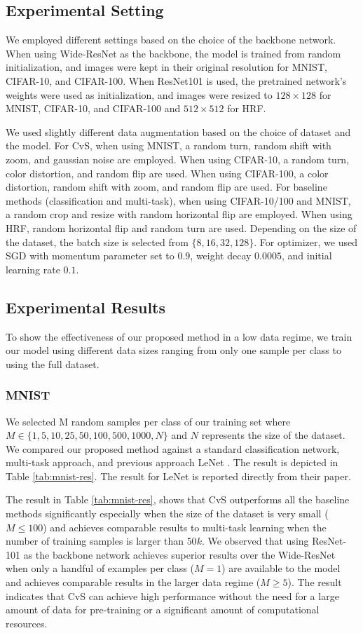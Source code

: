 \documentclass[conference]{IEEEtran}
\begin{document}
\subsection{Experimental Setting}
We employed different settings based on the choice of the backbone network. When using Wide-ResNet as the backbone, the model is trained from random initialization, and images were kept in their original resolution for MNIST, CIFAR-10, and CIFAR-100. When ResNet101 is used, the pretrained network’s weights were used as initialization, and images were resized to $128\times128$ for MNIST, CIFAR-10, and CIFAR-100 and $512\times512$ for HRF.  

We used slightly different data augmentation based on the choice of dataset and the model. For CvS, when using MNIST, a random turn, random shift with zoom, and gaussian noise are employed. When using CIFAR-10, a random turn, color distortion, and random flip are used. When using CIFAR-100, a color distortion, random shift with zoom, and random flip are used. For baseline methods (classification and multi-task), when using CIFAR-10/100 and MNIST, a random crop and resize with random horizontal flip are employed. When using HRF, random horizontal flip and random turn are used. Depending on the size of the dataset, the batch size is selected from $\{8, 16, 32, 128\}$. For optimizer, we used SGD with momentum parameter set to $0.9$, weight decay $0.0005$, and initial learning rate $0.1$.  

\subsection{Experimental Results}
To show the effectiveness of our proposed method in a low data regime, we train our model using different data sizes ranging from only one sample per class to using the full dataset. 

\subsubsection{MNIST}
We selected M random samples per class of our training set where $M \in \{1, 5, 10, 25, 50, 100, 500, 1000, N\}$ and $N$ represents the size of the dataset. We compared our proposed method against a standard classification network, multi-task approach, and previous approach LeNet \cite{byerly2020branching}. The result is depicted in Table \ref{tab:mnist-res}. The result for LeNet is reported directly from their paper.  

The result in Table \ref{tab:mnist-res}, shows that CvS outperforms all the baseline methods significantly especially when the size of the dataset is very small ($M\leqslant100$) and achieves comparable results to multi-task learning when the number of training samples is larger than $50k$. We observed that using ResNet-101 as the backbone network achieves superior results over the Wide-ResNet when only a handful of examples per class ($M=1$) are available to the model and achieves comparable results in the larger data regime ($M\geqslant5$). The result indicates that CvS can achieve high performance without the need for a large amount of data for pre-training or a significant amount of computational resources.  
\end{document}
